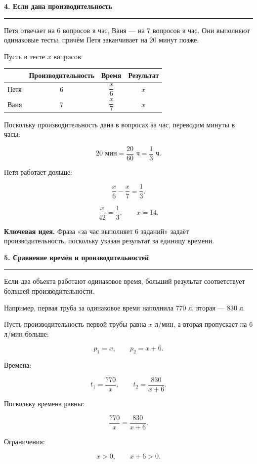 \documentclass[a4paper,12pt]{article}
\newcommand{\topic}[1]{%
    \vspace{0.5em}
    {\Large\bfseries\color{darkaccent}#1}\par
    \vspace{0.25em}
    {\color{accent!55}\rule{\linewidth}{0.6pt}}\par
    \vspace{0.45em}
}
\newcommand{\keyidea}[1]{%
    \textbf{\color{darkaccent}Ключевая идея.} #1
}
\begin{document}
\topic{4. Если дана производительность}

Петя отвечает на $6$ вопросов в час, Ваня --- на $7$ вопросов в час.
Они выполняют одинаковые тесты, причём Петя заканчивает на $20$ минут позже.

Пусть в тесте $x$ вопросов.

\begin{center}
\renewcommand{\arraystretch}{1.35}
\begin{tabularx}{0.78\linewidth}{@{} X c c c @{}}
\toprule
& \textbf{Производительность} & \textbf{Время} & \textbf{Результат} \\
\midrule
Петя & $6$ & $\dfrac{x}{6}$ & $x$ \\
Ваня & $7$ & $\dfrac{x}{7}$ & $x$ \\
\bottomrule
\end{tabularx}
\end{center}

Поскольку производительность дана в вопросах за час, переводим минуты в часы:

\[
20\text{ мин}=\frac{20}{60}\text{ ч}=\frac13\text{ ч}.
\]

Петя работает дольше:

\[
\frac{x}{6}-\frac{x}{7}=\frac13.
\]

\[
\frac{x}{42}=\frac13,
\qquad
\boxed{x=14}.
\]

\keyidea{Фраза «за час выполняет 6 заданий» задаёт производительность, поскольку указан результат за единицу времени.}


\topic{5. Сравнение времён и производительностей}

Если два объекта работают одинаковое время, больший результат соответствует большей производительности.

Например, первая труба за одинаковое время наполнила $770$ л, вторая --- $830$ л.

Пусть производительность первой трубы равна $x$ л/мин, а вторая пропускает на $6$ л/мин больше:

\[
p_1=x,
\qquad
p_2=x+6.
\]

Времена:

\[
t_1=\frac{770}{x},
\qquad
t_2=\frac{830}{x+6}.
\]

Поскольку времена равны:

\[
\boxed{
\frac{770}{x}=\frac{830}{x+6}
}.
\]

Ограничения:

\[
x>0,
\qquad
x+6>0.
\]
\end{document}
